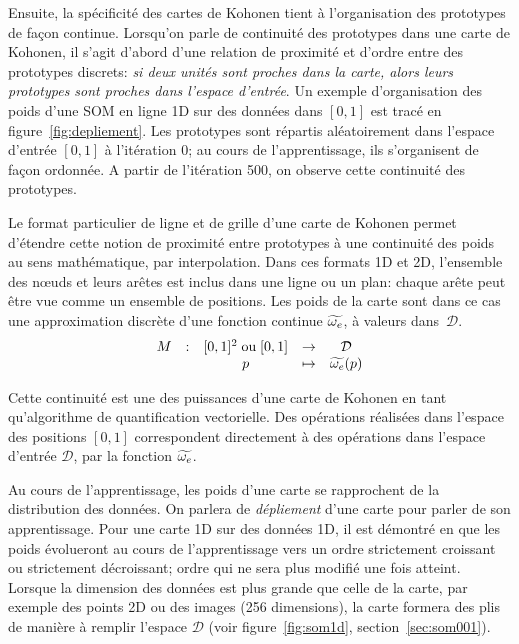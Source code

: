 Ensuite, la spécificité des cartes de Kohonen tient à l'organisation des prototypes de façon continue. Lorsqu'on parle de continuité des prototypes dans une carte de Kohonen, il s'agit d'abord d'une relation de proximité et d'ordre entre des prototypes discrets: \emph{si deux unités sont proches dans la carte, alors leurs prototypes sont proches dans l'espace d'entrée}. Un exemple d'organisation des poids d'une SOM en ligne 1D sur des données dans $[0,1]$ est tracé en figure~\ref{fig:depliement}. Les prototypes sont répartis aléatoirement dans l'espace d'entrée $[0,1]$ à l'itération $0$; au cours de l'apprentissage, ils s'organisent de façon ordonnée. A partir de l'itération 500, on observe cette continuité des prototypes.

Le format particulier de ligne et de grille d'une carte de Kohonen permet d'étendre cette notion de proximité entre prototypes à une continuité des poids au sens mathématique, par interpolation. Dans ces formats 1D et 2D, l'ensemble des n\oe{}uds et leurs arêtes est inclus dans une ligne ou un plan: chaque arête peut être vue comme un ensemble de positions. Les poids de la carte sont dans ce cas une approximation discrète d'une fonction continue $\widetilde{\omega_e}$, à valeurs dans~$\mathcal{D}$.
\begin{equation*}
\begin{array}{ccccc}
M& : & [0,1]^2 \; \text{ou} \;[0,1] & \to &  \mathcal{D} \\
 & & p & \mapsto & \widetilde{\omega_e}(p) \\
\end{array}
\end{equation*}

Cette continuité est une des puissances d'une carte de Kohonen en tant qu'algorithme de quantification vectorielle. Des opérations réalisées dans l'espace des positions $[0,1]$ correspondent directement à des opérations dans l'espace d'entrée $\mathcal{D}$, par la fonction $\widetilde{\omega_e}$.

Au cours de l'apprentissage, les poids d'une carte se rapprochent de la distribution des données. On parlera de \emph{dépliement} d'une carte pour parler de son apprentissage.
Pour une carte 1D sur des données 1D, il est démontré en \cite{Kohonen1995SelfOrganizingM} que les poids évolueront au cours de l'apprentissage vers un ordre strictement croissant ou strictement décroissant; ordre qui ne sera plus modifié une fois atteint. 
Lorsque la dimension des données est plus grande que celle de la carte, par exemple des points 2D ou des images (256 dimensions), la carte formera des plis de manière à remplir l'espace $\mathcal{D}$ (voir figure~\ref{fig:som1d}, section~\ref{sec:som001}). 

